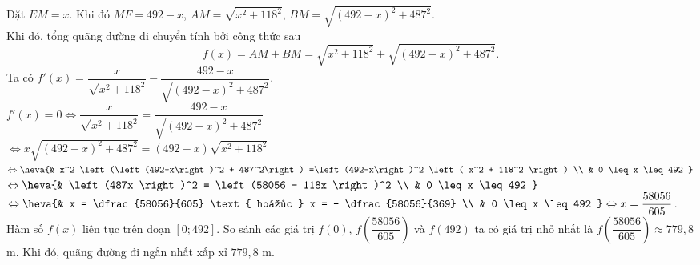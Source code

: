 \begin{bt}
{\begin{center}
\end{center}
Đặt $EM =x$. Khi đó $MF = 492 -x$, $AM = \sqrt{x^2 + 118^2}$, $BM = \sqrt{\left(492-x\right)^2 + 487^2}$. \\
Khi đó, tổng quãng đường di chuyển tính bởi công thức sau 
$$f(x) = AM + BM = \sqrt{x^2 + 118^2} + \sqrt{\left(492-x\right)^2 + 487^2}. $$
Ta có $f' (x) = \dfrac{x}{\sqrt{x^2 + 118^2}} - \dfrac{492 -x}{\sqrt{\left(492-x\right)^2 + 487^2}}$. \\
$f' (x) = 0 \Leftrightarrow \dfrac{x}{\sqrt{x^2 + 118^2}} = \dfrac{492 -x}{\sqrt{\left(492-x\right)^2 + 487^2}}$ \\ 
$\Leftrightarrow x \sqrt{\left(492-x\right)^2 + 487^2} = \left(492-x\right) \sqrt{x^2 + 118^2}$ \\
$\Leftrightarrow \heva{& x^2 \left(\left(492-x\right)^2 + 487^2\right) =\left(492-x\right)^2 \left( x^2 + 118^2 \right) \\ & 0 \leq x \leq 492 }$ \\ 
$\Leftrightarrow \heva{& \left(487x \right)^2 = \left(58056 - 118x \right)^2 \\ & 0 \leq x \leq 492 }$ \\ 
$\Leftrightarrow \heva{& x = \dfrac{58056}{605} \text{ hoặc } x = - \dfrac{58056}{369} \\ & 0 \leq x \leq 492 } \Leftrightarrow x = \dfrac{58056}{605}$. \\
Hàm số $f(x)$ liên tục trên đoạn $\left[0; 492 \right]$. So sánh các giá trị $f \left(0 \right)$, $f \left(\dfrac{58056}{605}\right)$ và $f \left(492 \right)$ ta có giá trị nhỏ nhất là $f \left(\dfrac{58056}{605}\right) \approx 779{,}8$ m. Khi đó, quãng đường đi ngắn nhất xấp xỉ $779{,}8$ m. 
}
\end{bt}


